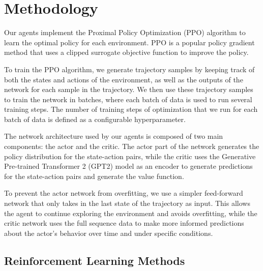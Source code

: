 \documentclass[conference]{IEEEtran}
\begin{document}
\section{Methodology}

Our agents implement the Proximal Policy Optimization (PPO) algorithm to learn the optimal policy for each environment. PPO is a popular policy gradient method that uses a clipped surrogate objective function to improve the policy.

To train the PPO algorithm, we generate trajectory samples by keeping track of both the states and actions of the environment, as well as the outputs of the network for each sample in the trajectory. We then use these trajectory samples to train the network in batches, where each batch of data is used to run several training steps. The number of training steps of optimization that we run for each batch of data is defined as a configurable hyperparameter.

The network architecture used by our agents is composed of two main components: the actor and the critic. The actor part of the network generates the policy distribution for the state-action pairs, while the critic uses the Generative Pre-trained Transformer 2 (GPT2) model as an encoder to generate predictions for the state-action pairs and generate the value function.

To prevent the actor network from overfitting, we use a simpler feed-forward network that only takes in the last state of the trajectory as input. This allows the agent to continue exploring the environment and avoids overfitting, while the critic network uses the full sequence data to make more informed predictions about the actor's behavior over time and under specific conditions.


\subsection{Reinforcement Learning Methods}
\end{document}
